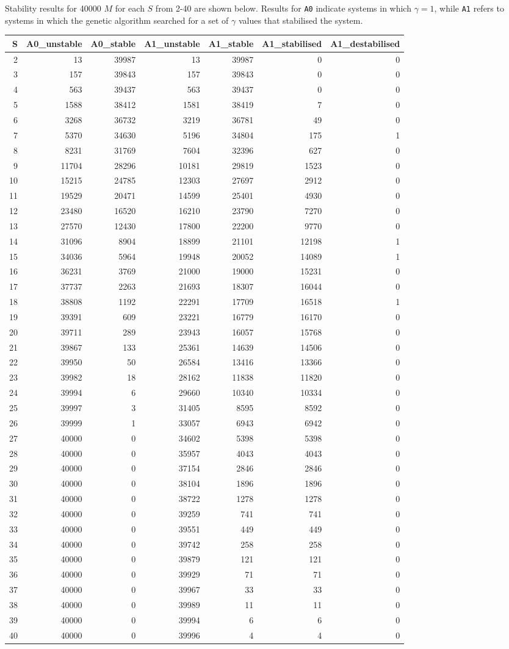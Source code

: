 \documentclass[]{article}
\begin{document}
Stability results for 40000 \(M\) for each \(S\) from 2-40 are shown below. Results for \texttt{A0}
indicate systems in which \(\gamma = 1\), while \texttt{A1} refers to systems in 
which the genetic algorithm searched for a set of \(\gamma\) values that 
stabilised the system. 

\begin{longtable}[]{@{}rrrrrrr@{}}
\toprule
S & A0\_unstable & A0\_stable & A1\_unstable & A1\_stable &
A1\_stabilised & A1\_destabilised\tabularnewline
\midrule
\endhead
2 & 13 & 39987 & 13 & 39987 & 0 & 0\tabularnewline
3 & 157 & 39843 & 157 & 39843 & 0 & 0\tabularnewline
4 & 563 & 39437 & 563 & 39437 & 0 & 0\tabularnewline
5 & 1588 & 38412 & 1581 & 38419 & 7 & 0\tabularnewline
6 & 3268 & 36732 & 3219 & 36781 & 49 & 0\tabularnewline
7 & 5370 & 34630 & 5196 & 34804 & 175 & 1\tabularnewline
8 & 8231 & 31769 & 7604 & 32396 & 627 & 0\tabularnewline
9 & 11704 & 28296 & 10181 & 29819 & 1523 & 0\tabularnewline
10 & 15215 & 24785 & 12303 & 27697 & 2912 & 0\tabularnewline
11 & 19529 & 20471 & 14599 & 25401 & 4930 & 0\tabularnewline
12 & 23480 & 16520 & 16210 & 23790 & 7270 & 0\tabularnewline
13 & 27570 & 12430 & 17800 & 22200 & 9770 & 0\tabularnewline
14 & 31096 & 8904 & 18899 & 21101 & 12198 & 1\tabularnewline
15 & 34036 & 5964 & 19948 & 20052 & 14089 & 1\tabularnewline
16 & 36231 & 3769 & 21000 & 19000 & 15231 & 0\tabularnewline
17 & 37737 & 2263 & 21693 & 18307 & 16044 & 0\tabularnewline
18 & 38808 & 1192 & 22291 & 17709 & 16518 & 1\tabularnewline
19 & 39391 & 609 & 23221 & 16779 & 16170 & 0\tabularnewline
20 & 39711 & 289 & 23943 & 16057 & 15768 & 0\tabularnewline
21 & 39867 & 133 & 25361 & 14639 & 14506 & 0\tabularnewline
22 & 39950 & 50 & 26584 & 13416 & 13366 & 0\tabularnewline
23 & 39982 & 18 & 28162 & 11838 & 11820 & 0\tabularnewline
24 & 39994 & 6 & 29660 & 10340 & 10334 & 0\tabularnewline
25 & 39997 & 3 & 31405 & 8595 & 8592 & 0\tabularnewline
26 & 39999 & 1 & 33057 & 6943 & 6942 & 0\tabularnewline
27 & 40000 & 0 & 34602 & 5398 & 5398 & 0\tabularnewline
28 & 40000 & 0 & 35957 & 4043 & 4043 & 0\tabularnewline
29 & 40000 & 0 & 37154 & 2846 & 2846 & 0\tabularnewline
30 & 40000 & 0 & 38104 & 1896 & 1896 & 0\tabularnewline
31 & 40000 & 0 & 38722 & 1278 & 1278 & 0\tabularnewline
32 & 40000 & 0 & 39259 & 741 & 741 & 0\tabularnewline
33 & 40000 & 0 & 39551 & 449 & 449 & 0\tabularnewline
34 & 40000 & 0 & 39742 & 258 & 258 & 0\tabularnewline
35 & 40000 & 0 & 39879 & 121 & 121 & 0\tabularnewline
36 & 40000 & 0 & 39929 & 71 & 71 & 0\tabularnewline
37 & 40000 & 0 & 39967 & 33 & 33 & 0\tabularnewline
38 & 40000 & 0 & 39989 & 11 & 11 & 0\tabularnewline
39 & 40000 & 0 & 39994 & 6 & 6 & 0\tabularnewline
40 & 40000 & 0 & 39996 & 4 & 4 & 0\tabularnewline
\bottomrule
\end{longtable}
\end{document}
